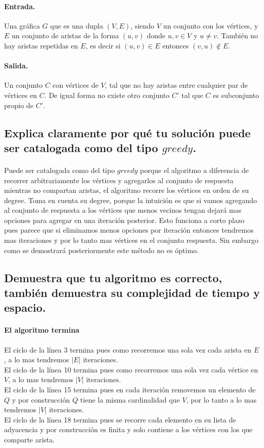 \documentclass[12pt]{article}
\begin{document}
\paragraph{Entrada.}Una gráfica $G$ que es una dupla $(V, E)$, siendo $V$ un conjunto con los vértices, y $E$ un conjunto de aristas de la forma $(u, v)$ donde $u, v\in V$ y $u \neq v$. También no hay aristas repetidas en $E$, es decir si $(u, v) \in E$ entonces $(v, u) \notin E$.
\paragraph{Salida.} Un conjunto $C$ con vértices de $V$, tal que no hay aristas entre cualquier par de vértices en $C$. De igual forma no existe otro conjunto $C'$ tal que $C$ es subconjunto propio de $C'$.
\subsection{Explica claramente por qué tu solución puede ser catalogada como del tipo $greedy$.}
\paragraph{}Puede ser catalogada como del tipo $greedy$ porque el algoritmo a diferencia de recorrer arbitrariamente los vértices y agregarlos al conjunto de respuesta mientras no compartan aristas, el algoritmo recorre los vértices en orden de su degree. Toma en cuenta su degree, porque la intuición es que si vamos agregando al conjunto de respuesta a los vértices que menos vecinos tengan dejará mas opciones para agregar en una iteración posterior. Esto funciona a corto plazo pues parece que si eliminamos menos opciones por iteración entonces tendremos mas iteraciones y por lo tanto mas vértices en el conjunto respuesta. Sin embargo como se demostrará posteriormente este método no es óptimo.\\
\subsection{Demuestra que tu algoritmo es correcto, también demuestra su complejidad de tiempo y espacio.}
\paragraph{El algoritmo termina}
El ciclo de la línea 3 termina pues como recorremos una sola vez cada arista en $E$, a lo mas tendremos $|E|$ iteraciones.\\
El ciclo de la línea 10 termina pues como recorremos una sola vez cada vértice en $V$, a lo mas tendremos $|V|$ iteraciones.\\
El ciclo de la línea 15 termina pues en cada iteración removemos un elemento de $Q$ y por construcción $Q$ tiene la misma cardinalidad que $V$, por lo tanto a lo mas tendremos $|V|$ iteraciones.\\
El ciclo de la línea 18 termina pues se recorre cada elemento en su lista de adyacencia y por construcción es finita y solo contiene a los vértices con los que comparte arista.\\
\end{document}
